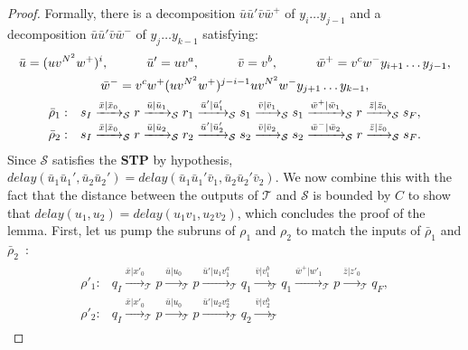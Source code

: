 \documentclass[a4paper,UKenglish,cleveref, autoref, thm-restate,authorcolumns, colorlinks]{lipics-v2021}
\newcommand\delay{\mathit{delay}}
\newcommand{\trans}{\mathcal{T}}
\newcommand{\transs}{\mathcal{S}}
\newcommand{\STP}[0]{\textbf{STP}}
\begin{document}
\begin{proof}
Formally, there is a decomposition
$\bar{u}\bar{u}'\bar{v}\bar{w}^+$ of $y_{i} \ldots y_{j-1}$
and a decomposition $\bar{u}\bar{u}'\bar{v}\bar{w}^-$ of $y_{j} \ldots y_{k-1}$
satisfying:
\begin{gather*}
    \bar{u} = (uv^{N^2}w^+)^i, \quad \quad \quad 
    \bar{u}' = uv^a, \quad \quad \quad 
    \bar{v} = v^b, \quad \quad \quad 
    \bar{w}^+ = v^{c}w^-y_{i+1} \ldots y_{j-1}, \\
    \hfill \bar{w}^- = v^{c}w^+(uv^{N^2}w^+)^{j-i-1}uv^{N^2}w^-y_{j+1} \ldots y_{k-1},\hfill\\
    \begin{array}{lllllllllllll}
    \bar{\rho}_1: &
    s_I  \xrightarrow{\bar{x}|\bar{x}_0}_\transs 
    r  \xrightarrow{\bar{u}|\bar{u}_1}_\transs 
    r_1  \xrightarrow{\bar{u}'|\bar{u}_1'}_\transs 
    s_1  \xrightarrow{\bar{v}|\bar{v}_1}_\transs 
    s_1  \xrightarrow{\bar{w}^+|\bar{w}_1}_\transs 
    r  \xrightarrow{\bar{z}|\bar{z}_0}_\transs 
    s_F, \\
    \bar{\rho}_2: &
    s_I  \xrightarrow{\bar{x}|\bar{x}_0}_\transs 
    r  \xrightarrow{\bar{u}|\bar{u}_2}_\transs 
    r_2  \xrightarrow{\bar{u}'|\bar{u}_2'}_\transs 
    s_2  \xrightarrow{\bar{v}|\bar{v}_2}_\transs 
    s_2  \xrightarrow{\bar{w}^-|\bar{w}_2}_\transs 
    r \xrightarrow{\bar{z}|\bar{z}_0}_\transs 
    s_F.    
    \end{array}
\end{gather*}
Since $\transs$ satisfies the \STP{} by hypothesis,
$\delay(\bar{u}_1\bar{u}_1',\bar{u}_2\bar{u}_2') = \delay(\bar{u}_1\bar{u}_1'\bar{v}_1,\bar{u}_2\bar{u}_2'\bar{v}_2)$.
We now combine this with the fact that the distance
between the outputs of $\trans$ and $\transs$ is bounded by $C$
to show that $\delay(u_1,u_2) = \delay(u_1v_1,u_2v_2)$,
which concludes the proof of the lemma.
First, let us pump the subruns of $\rho_1$
and $\rho_2$ to match the inputs of $\bar{\rho}_1$ and $\bar{\rho}_2$~:
\begin{gather*}
    \begin{array}{lllllllllllll}
    \rho'_1: &
    q_I \xrightarrow{\bar{x}|x'_0}_\trans
    p \xrightarrow{\bar{u}|u_0}_\trans
    p \xrightarrow{\bar{u}'|u_1v_1^a}_\trans
    q_1 \xrightarrow{\bar{v}|v_1^b}_\trans
    q_1 \xrightarrow{\bar{w}^+|w'_1}_\trans
    p \xrightarrow{\bar{z}|z'_0}_\trans
    q_F, \\
    \rho'_2: &
    q_I \xrightarrow{\bar{x}|x'_0}_\trans
    p \xrightarrow{\bar{u}|u_0}_\trans
    p \xrightarrow{\bar{u}'|u_2v_2^a}_\trans
    q_2 \xrightarrow{\bar{v}|v_2^b}_\trans

\end{array}
\end{gather*}
\end{proof}
\end{document}
